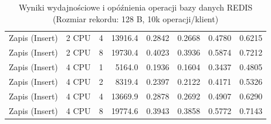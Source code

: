 \begin{table}[ht]
{\begin{tabular}{llcrrrrr}
Zapis (Insert) & 2 CPU & 4 & 13916.4 & 0.2842 & 0.2668 & 0.4780 & 0.6215 \\
Zapis (Insert) & 2 CPU & 8 & 19730.4 & 0.4023 & 0.3936 & 0.5874 & 0.7212 \\
Zapis (Insert) & 4 CPU & 1 & 5164.0 & 0.1936 & 0.1604 & 0.3437 & 0.4805 \\
Zapis (Insert) & 4 CPU & 2 & 8319.4 & 0.2397 & 0.2122 & 0.4171 & 0.5326 \\
Zapis (Insert) & 4 CPU & 4 & 13669.9 & 0.2878 & 0.2692 & 0.4907 & 0.6290 \\
Zapis (Insert) & 4 CPU & 8 & 19774.6 & 0.3943 & 0.3858 & 0.5772 & 0.7143 \\
\bottomrule
\end{tabular}%
}
\caption{Wyniki wydajnościowe i opóźnienia operacji bazy danych REDIS (Rozmiar rekordu: 128 B, 10k operacji/klient)}
\label{tab:latency_redis_small_10000}
\end{table}
